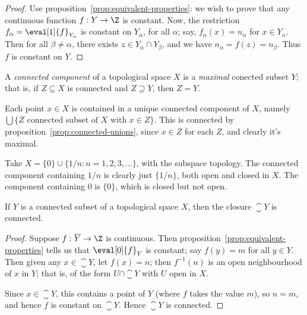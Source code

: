 \begin{proof}
	Use proposition~\ref{prop:equivalent-properties}: we wish to prove that any continuous function $f:Y\to\Z$ is constant. Now, the restriction $f_\alpha = \eval[1]{f}_{Y_\alpha}$ is constant on $Y_\alpha$, for all $\alpha$; say, $f_\alpha(x)=n_\alpha$ for $x\in Y_\alpha$.
	Then for all $\beta\neq \alpha$, there exists $z\in Y_\alpha \cap Y_\beta$, and we have $n_\alpha = f(z) = n_\beta$. Thus $f$ is constant on $Y$.
\end{proof}

\begin{definition}
	A \emph{connected component} of a topological space $X$ is a \emph{maximal} conected subset $Y$; that is, if $Z\subseteq X$ is connected and $Z\supseteq Y$, then $Z=Y$.
	
	Each point $x\in X$ is contained in a unique connected component of $X$, namely $\bigcup\{Z \text{ connected subset of } X \text{ with } x\in Z\}$. This is connected by proposition~\ref{prop:connected-unions}, since $x\in Z$ for each $Z$, and clearly it's maximal.
\end{definition}

\begin{example}
	Take $X=\{0\} \cup \{1/n: n=1,2,3,\ldots\}$, with the subspace topology. The connected component containing $1/n$ is clearly just $\{1/n\}$, both open and closed in $X$. The component containing $0$ is $\{0\}$, which is closed but not open.
\end{example}

	\pagebreak

\begin{proposition}
	If $Y$ is a connected subset of a topological space $X$, then the closure $\closure{Y}$ is connected.
\end{proposition}

\begin{proof}
	Suppose $f:\closure{Y}\to\Z$ is continuous. Then proposition~\ref{prop:equivalent-properties} tells us that $\eval[0]{f}_Y$ is constant; say $f(y)=m$ for all $y\in Y$. Then given any $x\in\closure{Y}$, let $f(x)=n$; then $f^{-1}(n)$ is an open neighbourhood of $x$ in $Y$; that is, of the form $U\cap\closure{Y}$ with $U$ open in $X$.
	
	Since $x\in\closure{Y}$, this contains a point of $Y$ (where $f$ takes the value $m$), so $n=m$, and hence $f$ is constant on $\closure{Y}$. Hence $\closure{Y}$ is connected.
\end{proof}

